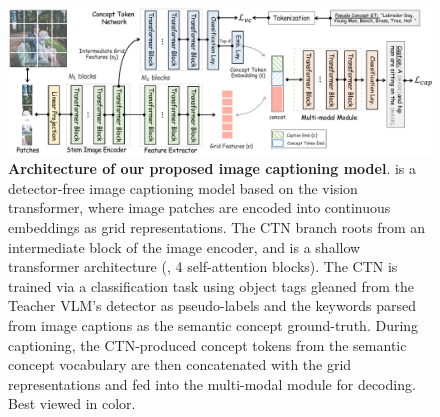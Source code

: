 \begin{figure}[t!]
  \begin{center}
    \includegraphics[width=\textwidth, height=0.35\textwidth]{./images/vitcap_architecture.pdf}
    \vspace{-8mm}
  \end{center}
    \caption[Architecture of our proposed \vitcapp image captioning model]{\small \textbf{Architecture of our proposed \vitcapp image captioning model}. \vitcapp is a detector-free image captioning model based on the vision transformer, where image patches are encoded into continuous embeddings as grid representations. The CTN branch roots from an intermediate block of the image encoder, and is a shallow transformer architecture (\eg, 4 self-attention blocks). The CTN is trained via a classification task using object tags gleaned from the Teacher VLM's detector as pseudo-labels and the keywords parsed from image captions as the semantic concept ground-truth. During captioning, the CTN-produced concept tokens from the semantic concept vocabulary are then concatenated with the grid representations and fed into the multi-modal module for decoding. Best viewed in color.
    }
  \label{fig:architecture}
  \vspace{-3mm}
  \end{figure}

